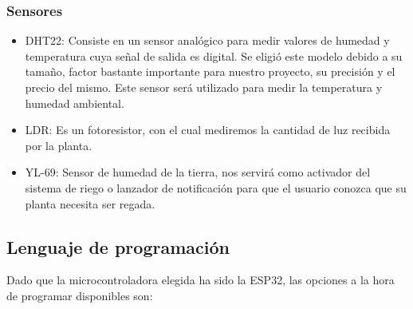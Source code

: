 \documentclass[runningheads]{llncs}
\begin{document}
\subsubsection*{Sensores}
\begin{itemize}
    \item DHT22: Consiste en un sensor analógico para medir valores de    humedad y temperatura cuya señal de salida es digital.  Se eligió  este modelo debido a su tamaño, factor bastante importante para   nuestro proyecto, su precisión y el precio del mismo. \newline Este
    sensor será utilizado para medir la temperatura y humedad ambiental.
    
    \item LDR: Es un fotoresistor, con el cual mediremos la cantidad de
    luz recibida por la planta.
    
    \item YL-69: Sensor de humedad de la tierra, nos servirá como
    activador del sistema de riego o lanzador de notificación para que
    el usuario conozca que su planta necesita ser regada.
    
\end{itemize}

\subsection*{Lenguaje de programación}

Dado que la microcontroladora elegida ha sido la ESP32, las opciones a
la hora de programar disponibles son:
\end{document}
